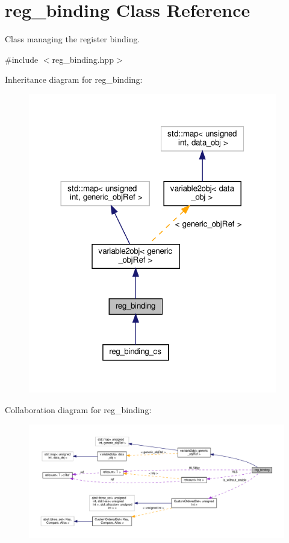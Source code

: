 \hypertarget{classreg__binding}{}\section{reg\+\_\+binding Class Reference}
\label{classreg__binding}


Class managing the register binding.  




{\ttfamily \#include $<$reg\+\_\+binding.\+hpp$>$}



Inheritance diagram for reg\+\_\+binding\+:
\nopagebreak
\begin{figure}[H]
\begin{center}
\leavevmode
\includegraphics[width=308pt]{d3/de2/classreg__binding__inherit__graph}
\end{center}
\end{figure}


Collaboration diagram for reg\+\_\+binding\+:
\nopagebreak
\begin{figure}[H]
\begin{center}
\leavevmode
\includegraphics[width=350pt]{d8/d03/classreg__binding__coll__graph}
\end{center}
\end{figure}
